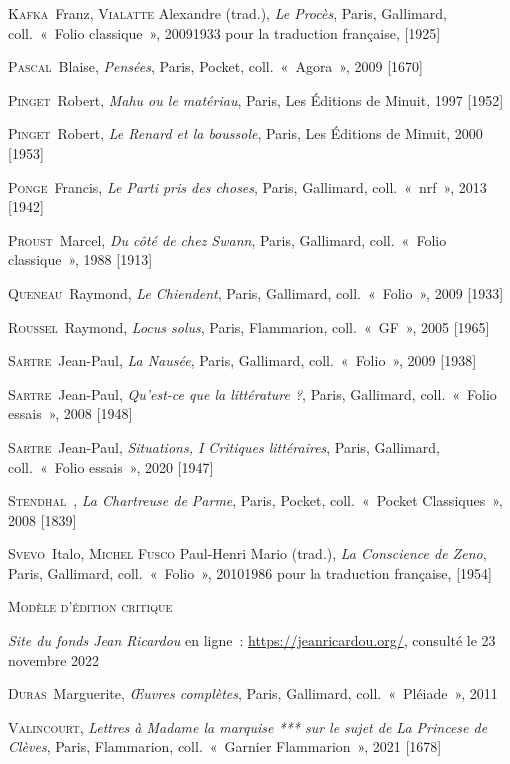 	\textsc{Kafka}~Franz, \textsc{Vialatte} Alexandre (trad.), \textit{Le Procès}, Paris, Gallimard, coll.~«~Folio classique~», 20091933 pour la traduction française,  [1925]\par 
	\textsc{Pascal}~Blaise, \textit{Pensées}, Paris, Pocket, coll.~«~Agora~», 2009 [1670]\par 
	\textsc{Pinget}~Robert, \textit{Mahu ou le matériau}, Paris, Les Éditions de Minuit, 1997 [1952]\par 
	\textsc{Pinget}~Robert, \textit{Le Renard et la boussole}, Paris, Les Éditions de Minuit, 2000 [1953]\par 
	\textsc{Ponge}~Francis, \textit{Le Parti pris des choses}, Paris, Gallimard, coll.~«~nrf~», 2013 [1942]\par 
	\textsc{Proust}~Marcel, \textit{Du côté de chez Swann}, Paris, Gallimard, coll.~«~Folio classique~», 1988 [1913]\par 
	\textsc{Queneau}~Raymond, \textit{Le Chiendent}, Paris, Gallimard, coll.~«~Folio~», 2009 [1933]\par 
	\textsc{Roussel}~Raymond, \textit{Locus solus}, Paris, Flammarion, coll.~«~GF~», 2005 [1965]\par 
	\textsc{Sartre}~Jean-Paul, \textit{La Nausée}, Paris, Gallimard, coll.~«~Folio~», 2009 [1938]\par 
	\textsc{Sartre}~Jean-Paul, \textit{Qu'est-ce que la littérature ?}, Paris, Gallimard, coll.~«~Folio essais~», 2008 [1948]\par 
	\textsc{Sartre}~Jean-Paul, \textit{Situations, I Critiques littéraires}, Paris, Gallimard, coll.~«~Folio essais~», 2020 [1947]\par 
	\textsc{Stendhal}~, \textit{La Chartreuse de Parme}, Paris, Pocket, coll.~«~Pocket Classiques~», 2008 [1839]\par 
	\textsc{Svevo}~Italo, \textsc{Michel Fusco} Paul-Henri Mario (trad.), \textit{La Conscience de Zeno}, Paris, Gallimard, coll.~«~Folio~», 20101986 pour la traduction française,  [1954]\par 
	
		\vspace*{2cm}
		\setlength{\parindent}{0cm}
{\large\textsc{Modèle d'édition critique}}
		\vspace*{1cm}
		\setlength{\parindent}{25pt}
		
		
		

		
		
		\textit{Site du fonds Jean Ricardou} en ligne~: \hyperlink{https://jeanricardou.org/}{https://jeanricardou.org/}, consulté le 23 novembre 2022\par

	\textsc{Duras}~Marguerite, \textit{Œuvres complètes}, Paris, Gallimard, coll.~«~Pléiade~», 2011\par 
	\textsc{Valincourt}, \textit{Lettres à Madame la marquise *** sur le sujet de La Princese de Clèves}, Paris, Flammarion, coll.~«~Garnier Flammarion~», 2021 [1678]\par